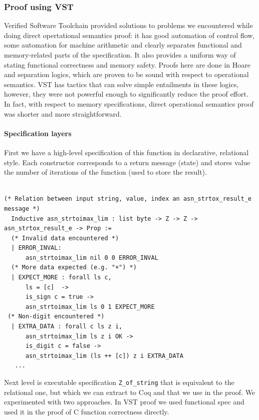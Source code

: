 \documentclass[acmsmall,nonacm]{acmart}
\begin{document}
\subsubsection{Proof using VST}

Verified Software Toolchain provided solutions to problems we encountered while doing direct opertational semantics proof: it has good automation of control flow, some automation for machine arithmetic and clearly separates functional and memory-related parts of the specification. It also provides a uniform way of stating functional correctness and memory safety. Proofs here are done in Hoare and separation logics, which are proven to be sound with respect to operational semantics. VST has tactics that can solve simple entailments in these logics, however, they were not powerful enough to significantly reduce the proof effort. In fact, with respect to memory specifications, direct operational semantics proof was shorter and more straightforward.

\paragraph{Specification layers} First we have a high-level specification of this function in declarative, relational style. Each constructor corresponds to a return message (state) and stores value the number of iterations of the function (used to store the result).

 \begin{lstlisting}[language=Coq]

(* Relation between input string, value, index an asn_strtox_result_e message *)
  Inductive asn_strtoimax_lim : list byte -> Z -> Z -> asn_strtox_result_e -> Prop :=
  (* Invalid data encountered *)
  | ERROR_INVAL:
      asn_strtoimax_lim nil 0 0 ERROR_INVAL
  (* More data expected (e.g. "+") *)
  | EXPECT_MORE : forall ls c,
      ls = [c]  ->
      is_sign c = true ->
      asn_strtoimax_lim ls 0 1 EXPECT_MORE
 (* Non-digit encountered *)
  | EXTRA_DATA : forall c ls z i,
      asn_strtoimax_lim ls z i OK ->
      is_digit c = false -> 
      asn_strtoimax_lim (ls ++ [c]) z i EXTRA_DATA
   ...    
  \end{lstlisting}

Next level is executable specification \texttt{Z\_of\_string} that is equivalent to the relational one, but which we can extract to Coq and that we use in the proof. We experimented with two approaches. In VST proof we used functional spec and used it in the proof of C function correctness directly.
\end{document}
